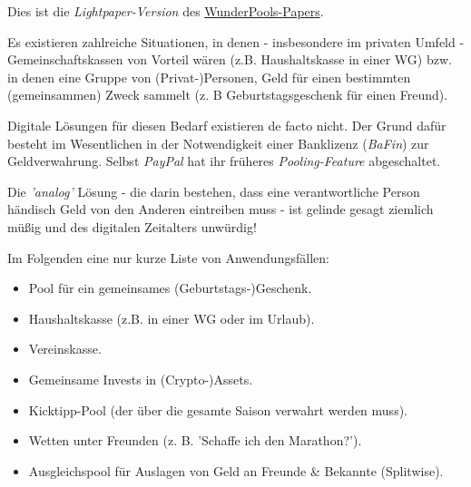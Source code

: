
Dies ist die \textit{Lightpaper-Version} des \href{https://github.com/WunderPass/White-Paper/blob/main/pools.pdf}{WunderPools-Papers}.

\vspace{0.3cm}


\begin{Problem}

Es existieren zahlreiche Situationen, in denen - insbesondere im privaten Umfeld - Gemeinschaftskassen von Vorteil wären (z.B. Haushaltskasse in einer WG) bzw. in denen eine Gruppe von (Privat-)Personen, Geld für einen bestimmten (gemeinsammen) Zweck sammelt (z. B Geburtstagsgeschenk für einen Freund).

\vspace{0.3cm}

Digitale Lösungen für diesen Bedarf existieren de facto nicht. Der Grund dafür besteht im Wesentlichen in der Notwendigkeit einer Banklizenz (\textit{BaFin}) zur Geldverwahrung. Selbst \textit{PayPal} hat ihr früheres \textit{Pooling-Feature} abgeschaltet.

\vspace{0.1cm}

Die \textit{'analog'} Lösung - die darin bestehen, dass eine verantwortliche Person händisch Geld von den Anderen eintreiben muss - ist gelinde gesagt ziemlich müßig und des digitalen Zeitalters unwürdig! 

\end{Problem}

\vspace{0.3cm}


\begin{Example}

Im Folgenden eine nur kurze Liste von Anwendungsfällen:

\begin{itemize}
  \item Pool für ein gemeinsames (Geburtstags-)Geschenk.
  \item Haushaltskasse (z.B. in einer WG oder im Urlaub).
  \item Vereinskasse.
  \item Gemeinsame Invests in (Crypto-)Assets.
  \item Kicktipp-Pool (der über die gesamte Saison verwahrt werden muss).
  \item Wetten unter Freunden (z. B. 'Schaffe ich den Marathon?').
  \item Ausgleichspool für Auslagen von Geld an Freunde \& Bekannte (Splitwise).
\end{itemize}

\end{Example}

